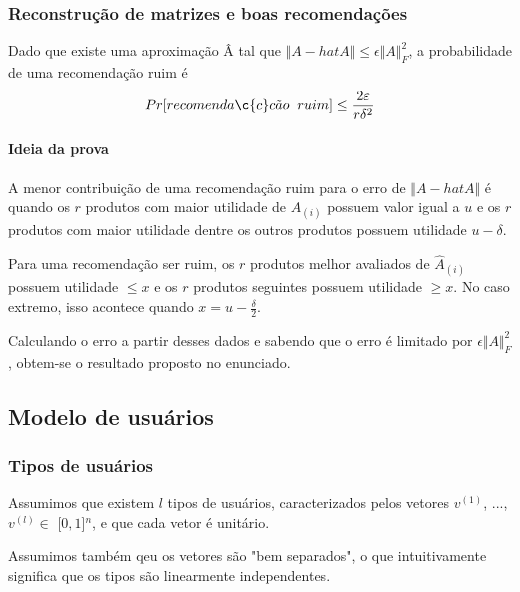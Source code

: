 \documentclass[a4paper,10pt]{article}
\begin{document}
\subsubsection{Reconstrução de matrizes e boas recomendações}

\begin{lema} \label{lema:box}
Dado que existe uma aproximação Â tal que $\Vert A - hat{A} \Vert \le \epsilon \Vert A
\Vert^2_F$, a probabilidade de uma recomenda\c{c}\~ao
ruim é 
\begin{equation}
Pr [ recomenda \c{c}c \tilde ao \;\; ruim ] \leq \frac{2\varepsilon}{r\delta^2}
\end{equation} 

\end{lema}

\paragraph{Ideia da prova\\}

A menor contribuição de uma recomendação ruim para o erro de $\Vert A - 
hat{A} \Vert$ é quando os $r$ produtos com maior utilidade 
de $A_{(i)}$ possuem valor igual a $u$ e os $r$ produtos com maior utilidade
dentre os outros produtos possuem utilidade $u - \delta$.
 
Para uma recomendação ser ruim, os $r$ produtos melhor avaliados de $\hat{A}_{(i)}$
possuem utilidade $\leq x$ e os $r$ produtos seguintes possuem utilidade
$\geq x$. No caso extremo, isso acontece quando $x = u - \frac{\delta}{2}$. 

Calculando o erro a partir desses dados e sabendo que o erro é limitado por $\epsilon 
\Vert A \Vert^2_F$, obtem-se o resultado proposto no enunciado.

\subsection{Modelo de usuários}

\subsubsection{Tipos de usuários}
Assumimos que existem $l$ tipos de usuários, caracterizados
pelos vetores $v^{(1)}$, ..., $v^{(l)} \in $ [$0,1$]$^n$, 
e que cada vetor é unitário. 

Assumimos também qeu os vetores são  "bem separados", o que
intuitivamente significa que os tipos são linearmente independentes. 
\end{document}
